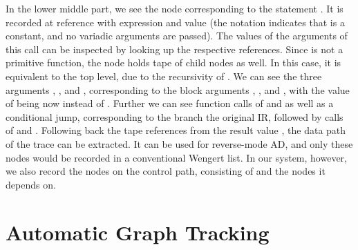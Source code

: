 In the lower middle part, we see the node corresponding to the statement .  It is recorded at reference  with expression  and value
 (the notation  indicates that  is a constant, and
no variadic arguments are passed). The values of the arguments of this call can be inspected by
looking up the respective references.  Since  is not a primitive function, the node
holds tape of child nodes as well.  In this case, it is equivalent to the top level, due to the
recursivity of . We can see the three arguments , , and ,
corresponding to the block arguments , , and , with the value of
 being now  instead of .  Further we can see function calls of
 and \jlinl{<} as well as a conditional jump, corresponding to the branch the original
IR, followed by calls of \jlinl{+} and . Following back the tape references from the
result value , the data path of the trace can be extracted.  It can be used for
reverse-mode AD, and only these nodes would be recorded in a conventional Wengert list.  In our
system, however, we also record the nodes on the control path, consisting of  and the
nodes it depends on.


\section{Automatic Graph Tracking}
\label{sec:autom-graph-track}



